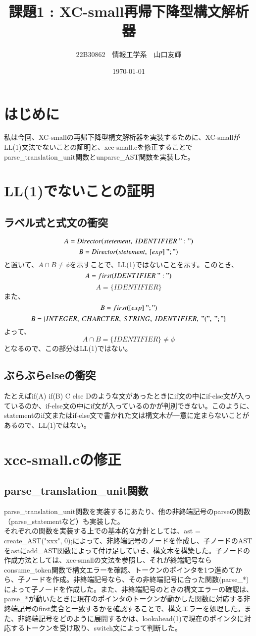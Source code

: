 \documentclass[a4paper,11pt]{jsarticle}
\begin{document}
\title{課題1 : XC-small再帰下降型構文解析器}
\author{22B30862　情報工学系　山口友輝}
\date{\today}
\maketitle

\section{はじめに}
私は今回、XC-smallの再帰下降型構文解析器を実装するために、XC-smallがLL(1)文法でないことの証明と、xcc-small.cを修正することでparse\_translation\_unit関数とunparse\_AST関数を実装した。

\section{LL(1)でないことの証明}
\subsection{ラベル式と式文の衝突}
$$A = Director(stetement,\ IDENTIFIER\ ":")$$
$$B = Director(stetement,\ [exp]\ ";")$$
と置いて、$A\cap B \neq \phi$を示すことで、LL(1)ではないことを示す。このとき、
$$A = first(IDENTIFIER\ ":")$$
$$A = \{IDENTIFIER\}$$
また、
$$B = first([exp]\ ";")$$
$$B = \{INTEGER,\ CHARCTER,\ STRING,\ IDENTIFIER,\ "(", \ ";"\}$$
よって、
$$A\cap B = \{IDENTIFIER\} \neq \phi$$
となるので、この部分はLL(1)ではない。
\subsection{ぶらぶらelseの衝突}
たとえばif(A) if(B) C else Dのような文があったときにif文の中にif-else文が入っているのか、if-else文の中にif文が入っているのかが判別できない。このように、statementのif文またはif-else文で書かれた文は構文木が一意に定まらないことがあるので、LL(1)ではない。
\newpage
\section{xcc-small.cの修正}
\subsection{parse\_translation\_unit関数}
parse\_translation\_unit関数を実装するにあたり、他の非終端記号のparseの関数（parse\_statementなど）も実装した。\\
\indent
それぞれの関数を実装する上での基本的な方針としては、ast = create\_AST("xxx", 0);によって、非終端記号のノードを作成し、子ノードのASTをastにadd\_AST関数によって付け足していき、構文木を構築した。子ノードの作成方法としては、xcc-smallの文法を参照し、それが終端記号ならconsume\_token関数で構文エラーを確認、トークンのポインタを1つ進めてから、子ノードを作成。非終端記号なら、その非終端記号に合った関数(parse\_*)によって子ノードを作成した。また、非終端記号のときの構文エラーの確認は、parse\_*が動いたときに現在のポインタのトークンが動かした関数に対応する非終端記号のfirst集合と一致するかを確認することで、構文エラーを処理した。また、非終端記号をどのように展開するかは、lookahead(1)で現在のポインタに対応するトークンを受け取り、switch文によって判断した。
\end{document}
